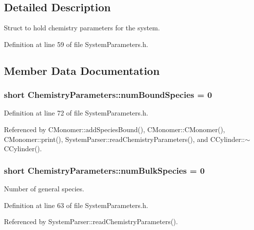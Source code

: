 \subsection{Detailed Description}
Struct to hold chemistry parameters for the system. 

Definition at line 59 of file System\+Parameters.\+h.



\subsection{Member Data Documentation}
\hypertarget{structChemistryParameters_a47fbf96b070976e8e0b7bb25a381ea54}{
\subsubsection[{num\+Bound\+Species}]{\setlength{\rightskip}{0pt plus 5cm}short Chemistry\+Parameters\+::num\+Bound\+Species = 0}}\label{structChemistryParameters_a47fbf96b070976e8e0b7bb25a381ea54}


Definition at line 72 of file System\+Parameters.\+h.



Referenced by C\+Monomer\+::add\+Species\+Bound(), C\+Monomer\+::\+C\+Monomer(), C\+Monomer\+::print(), System\+Parser\+::read\+Chemistry\+Parameters(), and C\+Cylinder\+::$\sim$\+C\+Cylinder().

\hypertarget{structChemistryParameters_a33f49ae4bed264d303989b7372b1ba4b}{
\subsubsection[{num\+Bulk\+Species}]{\setlength{\rightskip}{0pt plus 5cm}short Chemistry\+Parameters\+::num\+Bulk\+Species = 0}}\label{structChemistryParameters_a33f49ae4bed264d303989b7372b1ba4b}


Number of general species. 



Definition at line 63 of file System\+Parameters.\+h.



Referenced by System\+Parser\+::read\+Chemistry\+Parameters().

